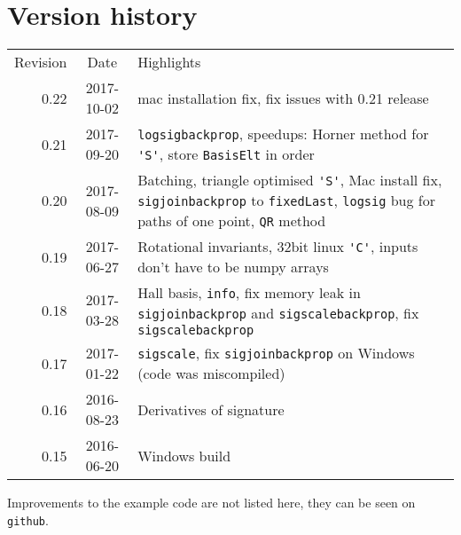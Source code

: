 \documentclass[a4paper]{extarticle}
\begin{document}
\section{Version history}
\begin{tabular}{rcp{}}
Revision&Date&Highlights\\[2mm]
0.22&2017-10-02&mac installation fix, fix issues with 0.21 release\\ %
0.21&2017-09-20&\verb|logsigbackprop|, %
speedups: Horner method for \verb|'S'|, store \verb|BasisElt| in order\\
0.20&2017-08-09&Batching, triangle optimised \verb|'S'|, Mac install fix, \verb|sigjoinbackprop| to \verb|fixedLast|, \verb|logsig| bug for paths of one point, \verb|QR| method\\
0.19&2017-06-27&Rotational invariants, 32bit linux \verb|'C'|, inputs don't have to be numpy arrays\\
0.18&2017-03-28&Hall basis, \verb|info|, fix memory leak in \verb|sigjoinbackprop| and \verb|sigscalebackprop|, fix \verb|sigscalebackprop|\\%
0.17&2017-01-22&\verb|sigscale|, fix \verb|sigjoinbackprop| on Windows (code was miscompiled)\\%
0.16&2016-08-23&Derivatives of signature%
\\
0.15&2016-06-20&Windows build\\
\end{tabular}
Improvements to the example code are not listed here, they can be seen on \verb|github|.

%



\printindex
\end{document}
